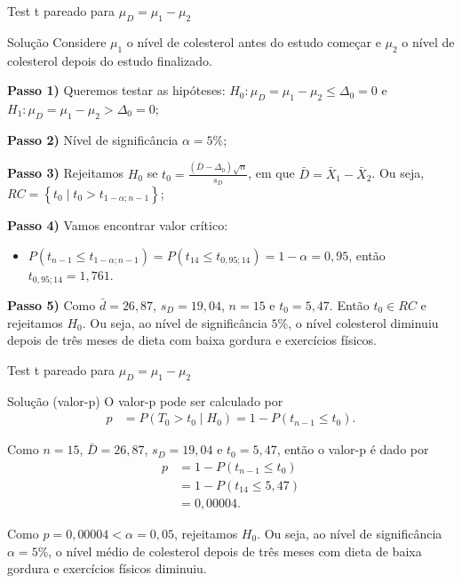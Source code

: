 \documentclass[9pt]{beamer}
\begin{document}
\begin{frame}{Test t pareado para $\mu_D = \mu_1 - \mu_2$}

\begin{block}{Solução}
	Considere $\mu_1$ o nível de colesterol antes do estudo começar e $\mu_2$ o nível de colesterol depois do estudo finalizado.
	
	\textbf{Passo 1)} Queremos testar as hipóteses: $H_0: \mu_D = \mu_1 - \mu_2 \leq \Delta_0=0$ e $H_1:\mu_D = \mu_1 - \mu_2 > \Delta_0 = 0$;
	
	\textbf{Passo 2)} Nível de significância $\alpha=5\%$;
	
	\textbf{Passo 3)} Rejeitamos $H_0$ se $t_0 = \frac{(\bar{D} - \Delta_0)\sqrt{n}}{s_D}$, em que $\bar{D} = \bar{X}_1 - \bar{X}_2$. Ou seja, $RC= \left\{ t_0 \mid t_0 > t_{1-\alpha; n-1}  \right\}$;
	
	\textbf{Passo 4)} Vamos encontrar valor crítico:
	\begin{itemize}
		\item $P\left(t_{n-1} \leq t_{1-\alpha;n-1}\right) = P\left(t_{14} \leq t_{0,95;14}\right) = 1-\alpha = 0,95$, então $t_{0,95;14} = 1,761$.
	\end{itemize}

	\textbf{Passo 5)} Como $\bar{d} = 26,87$, $s_D = 19,04$, $n=15$ e $t_0 = 5,47$. Então $t_0 \in RC$ e rejeitamos $H_0$. Ou seja, ao nível de significância $5\%$, o nível colesterol diminuiu depois de três meses de dieta com baixa gordura e exercícios físicos.
\end{block}

\end{frame}

\begin{frame}{Test t pareado para $\mu_D = \mu_1 - \mu_2$}

\begin{block}{Solução (valor-p)}
	O valor-p pode ser calculado por
	\begin{align*}
		p &= P \left( T_0 > t_0 \mid H_0 \right) = 1 - P(t_{n-1} \leq t_0).
	\end{align*}	
	
	Como $n = 15$, $\bar{D} = 26,87$, $s_D = 19,04$ e $t_0=5, 47$, então o valor-p é dado por
	\begin{align*}
		p &= 1 - P\left( t_{n-1} \leq t_0 \right)\\
		&= 1 - P \left( t_{14} \leq 5,47 \right)\\
		&= 0,00004.
	\end{align*}
	
	Como $p = 0,00004 < \alpha = 0,05$, rejeitamos $H_0$. Ou seja, ao nível de significância $\alpha=5\%$, o nível médio de colesterol depois de três meses com dieta de baixa gordura e exercícios físicos diminuiu.
\end{block}

\end{frame}
\end{document}
